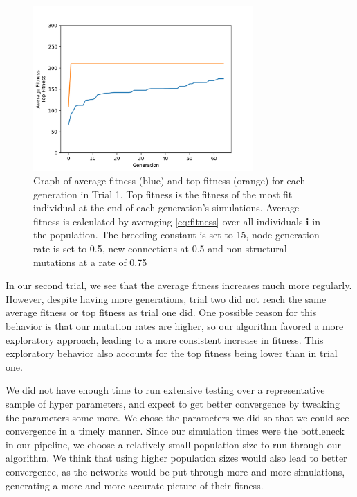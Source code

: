 \documentclass{article}
\begin{document}
\begin{figure}[h]\label{fig:fitness graph}
\centering
\includegraphics[width=0.75\textwidth]{fig_2}
\begin{changemargin}{0.15in}{0.15in}
  \caption{Graph of average fitness (blue) and top fitness (orange) for each
    generation in Trial 1. Top fitness is the fitness of the most fit individual
    at the end of each generation's simulations. Average fitness is calculated
    by averaging \eqref{eq:fitness} over all individuals $\bm{i}$ in the
    population. The breeding constant is set to 15, node generation rate is set
    to 0.5, new connections at 0.5 and non structural mutations at a rate of
    0.75}
\end{changemargin}
\end{figure}

In our second trial, we see that the average fitness increases much more
regularly. However, despite having more generations, trial two did not reach the
same average fitness or top fitness as trial one did. One possible reason for
this behavior is that our mutation rates are higher, so our algorithm favored a
more exploratory approach, leading to a more consistent increase in
fitness. This exploratory behavior also accounts for the top fitness being lower
than in trial one.

We did not have enough time to run extensive testing over a representative
sample of hyper parameters, and expect to get better convergence by tweaking the
parameters some more. We chose the parameters we did so that we could see
convergence in a timely manner. Since our simulation times were the bottleneck
in our pipeline, we choose a relatively small population size to run through our
algorithm. We think that using higher population sizes would also lead to better
convergence, as the networks would be put through more and more simulations,
generating a more and more accurate picture of their fitness.
\end{document}
